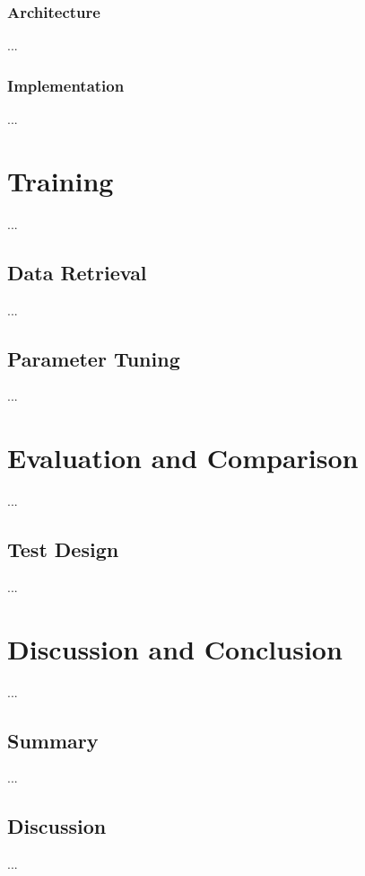 \subsection{Architecture}\label{c.postagging.rnn.architecture}
...

\subsection{Implementation}\label{c.postagging.rnn.implementation}
...

\chapter{Training}\label{c.training}
...

\section{Data Retrieval}\label{c.training.data}
...

\section{Parameter Tuning}\label{c.training.tuning}
...

\chapter{Evaluation and Comparison}\label{c.evaluation}
...

\section{Test Design}\label{c.evaluation.test}
...

\chapter{Discussion and Conclusion}\label{c.conclusion}
...

\section{Summary}\label{c.conclusion.summary}
...

\section{Discussion}\label{c.conclusion.discussion}
...

